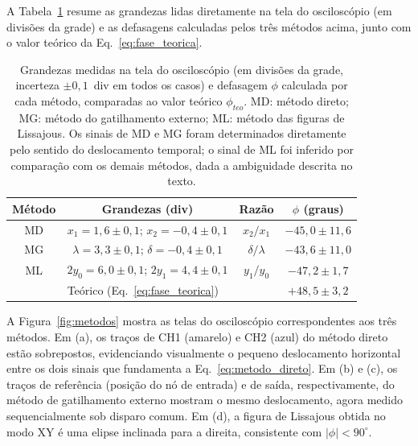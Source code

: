 \documentclass[reprint,amsmath,amssymb,aps,prl,floatfix,onecolumn]{revtex4-2}
\begin{document}
A Tabela~\ref{tab:fase} resume as grandezas lidas diretamente na tela do osciloscópio (em divisões da grade) e as defasagens calculadas pelos três métodos acima, junto com o valor teórico da Eq.~\eqref{eq:fase_teorica}.

\begin{table}[htb]
	\caption{\label{tab:fase} Grandezas medidas na tela do osciloscópio (em divisões da grade, incerteza $\pm0{,}1$~div em todos os casos) e defasagem $\phi$ calculada por cada método, comparadas ao valor teórico $\phi_{teo}$. MD: método direto; MG: método do gatilhamento externo; ML: método das figuras de Lissajous. Os sinais de MD e MG foram determinados diretamente pelo sentido do deslocamento temporal; o sinal de ML foi inferido por comparação com os demais métodos, dada a ambiguidade descrita no texto.}
	\begin{tabular}{c|c|c|c}
		\hline\hline
		\textbf{Método} & \textbf{Grandezas (div)} & \textbf{Razão} & \textbf{$\phi$ (graus)} \\ \hline
		MD & $x_1=1{,}6\pm0{,}1$; $x_2=-0{,}4\pm0{,}1$ & $x_2/x_1$ & $-45{,}0\pm11{,}6$ \\
		MG & $\lambda=3{,}3\pm0{,}1$; $\delta=-0{,}4\pm0{,}1$ & $\delta/\lambda$ & $-43{,}6\pm11{,}0$ \\
		ML & $2y_0=6{,}0\pm0{,}1$; $2y_1=4{,}4\pm0{,}1$ & $y_1/y_0$ & $-47{,}2\pm1{,}7$ \\ \hline
		\multicolumn{3}{c|}{Teórico (Eq.~\ref{eq:fase_teorica})} & $+48{,}5\pm3{,}2$ \\ \hline\hline
	\end{tabular}
\end{table}

A Figura~\ref{fig:metodos} mostra as telas do osciloscópio correspondentes aos três métodos. Em (a), os traços de CH1 (amarelo) e CH2 (azul) do método direto estão sobrepostos, evidenciando visualmente o pequeno deslocamento horizontal entre os dois sinais que fundamenta a Eq.~\eqref{eq:metodo_direto}. Em (b) e (c), os traços de referência (posição do nó de entrada) e de saída, respectivamente, do método de gatilhamento externo mostram o mesmo deslocamento, agora medido sequencialmente sob disparo comum. Em (d), a figura de Lissajous obtida no modo XY é uma elipse inclinada para a direita, consistente com $|\phi|<90^\circ$.
\end{document}
